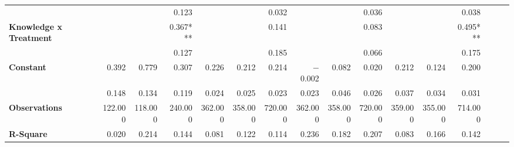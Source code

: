 \begin{tabular}{@{\extracolsep{5pt}}lrrrrrrrrrrrrrrr}
{\bf } & \phantom{***} & \phantom{***} & 0.123\phantom{\phantom{)}***} & \phantom{***} & \phantom{***} & 0.032\phantom{\phantom{)}***} & \phantom{***} & \phantom{***} & 0.036\phantom{\phantom{)}***} & \phantom{***} & \phantom{***} & 0.038\phantom{\phantom{)}***} \\
{\bf Knowledge x Treatment} & \phantom{***} & \phantom{***} & 0.367\phantom{)}*** & \phantom{***} & \phantom{***} & 0.141\phantom{\phantom{)}***} & \phantom{***} & \phantom{***} & 0.083\phantom{\phantom{)}***} & \phantom{***} & \phantom{***} & 0.495\phantom{)}*** \\
{\bf } & \phantom{***} & \phantom{***} & 0.127\phantom{\phantom{)}***} & \phantom{***} & \phantom{***} & 0.185\phantom{\phantom{)}***} & \phantom{***} & \phantom{***} & 0.066\phantom{\phantom{)}***} & \phantom{***} & \phantom{***} & 0.175\phantom{\phantom{)}***} \\
{\bf Constant} & 0.392\phantom{\phantom{)}***} & 0.779\phantom{\phantom{)}***} & 0.307\phantom{\phantom{)}***} & 0.226\phantom{\phantom{)}***} & 0.212\phantom{\phantom{)}***} & 0.214\phantom{\phantom{)}***} & $-$0.002\phantom{\phantom{)}***} & 0.082\phantom{\phantom{)}***} & 0.020\phantom{\phantom{)}***} & 0.212\phantom{\phantom{)}***} & 0.124\phantom{\phantom{)}***} & 0.200\phantom{\phantom{)}***} \\
{\bf } & 0.148\phantom{\phantom{)}***} & 0.134\phantom{\phantom{)}***} & 0.119\phantom{\phantom{)}***} & 0.024\phantom{\phantom{)}***} & 0.025\phantom{\phantom{)}***} & 0.023\phantom{\phantom{)}***} & 0.023\phantom{\phantom{)}***} & 0.046\phantom{\phantom{)}***} & 0.026\phantom{\phantom{)}***} & 0.037\phantom{\phantom{)}***} & 0.034\phantom{\phantom{)}***} & 0.031\phantom{\phantom{)}***} \\
{\bf Observations} & 122.000\phantom{\phantom{)}***} & 118.000\phantom{\phantom{)}***} & 240.000\phantom{\phantom{)}***} & 362.000\phantom{\phantom{)}***} & 358.000\phantom{\phantom{)}***} & 720.000\phantom{\phantom{)}***} & 362.000\phantom{\phantom{)}***} & 358.000\phantom{\phantom{)}***} & 720.000\phantom{\phantom{)}***} & 359.000\phantom{\phantom{)}***} & 355.000\phantom{\phantom{)}***} & 714.000\phantom{\phantom{)}***} \\
{\bf R-Square} & 0.020\phantom{***} & 0.214\phantom{***} & 0.144\phantom{***} & 0.081\phantom{***} & 0.122\phantom{***} & 0.114\phantom{***} & 0.236\phantom{***} & 0.182\phantom{***} & 0.207\phantom{***} & 0.083\phantom{***} & 0.166\phantom{***} & 0.142\phantom{***} \\
\hline
\end{tabular}
